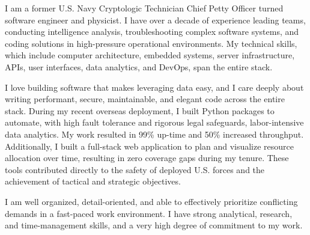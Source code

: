 \documentclass[11pt, a4paper]{coverletter}
\newenvironment{coverletter}{}{}
\begin{document}
\begin{header}
\address{Brooklyn, NY}
\mobile{}
\makeheader[C]
\end{header}
\begin{coverletter}
\begin{opening}
\makeletterstart
\end{opening}
\begin{body}
\setlength{\parindent}{0em}
\setlength{\parskip}{1em}
{\begin{clparagraphs}
\begin{clparagraph}
I am a former U.S. Navy Cryptologic Technician Chief Petty Officer turned software engineer and physicist. I have over a decade of experience leading teams, conducting intelligence analysis, troubleshooting complex software systems, and coding solutions in high-pressure operational environments. My technical skills, which include computer architecture, embedded systems, server infrastructure, APIs, user interfaces, data analytics, and DevOps, span the entire stack.
\end{clparagraph}
\end{clparagraphs}}
\setlength{\parindent}{0em}
\setlength{\parskip}{1em}
{\begin{clparagraphs}
\begin{clparagraph}
I love building software that makes leveraging data easy, and I care deeply about writing performant, secure, maintainable, and elegant code across the entire stack. During my recent overseas deployment, I built Python packages to automate, with high fault tolerance and rigorous legal safeguards, labor-intensive data analytics. My work resulted in 99\% up-time and 50\% increased throughput. Additionally, I built a full-stack web application to plan and visualize resource allocation over time, resulting in zero coverage gaps during my tenure. These tools contributed directly to the safety of deployed U.S. forces and the achievement of tactical and strategic objectives.
\end{clparagraph}
\begin{clparagraph}
I am well organized, detail-oriented, and able to effectively prioritize conflicting demands in a fast-paced work environment. I have strong analytical, research, and time-management skills, and a very high degree of commitment to my work.

\end{clparagraph}
\end{clparagraphs}}
\end{body}
\end{coverletter}
\end{document}
